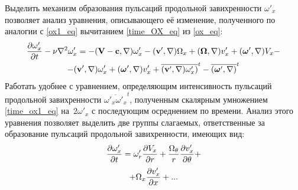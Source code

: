 Выделить механизм образования пульсаций продольной завихренности $\omega'_x$ позволяет анализ уравнения, описывающего её изменение, полученного по аналогии с \eqref{ox1_eq} вычитанием \eqref{time_OX_eq} из \eqref{ox_eq}:
\begin{multline}\label{time_ox1_eq}
\frac{\partial \omega'_x}{\partial t} - \nu \nabla^2 \omega'_x = - (\mathbf{V} - \mathbf{c}, \nabla) \omega'_x - (\mathbf{v}', \nabla) \Omega_x +(\mbox{\boldmath$\Omega$}, \nabla) v'_x + (\mbox{\boldmath$\omega$}', \nabla) V_x - \\ - (\mathbf{v}', \nabla) \omega'_x  + (\mbox{\boldmath$\omega$}', \nabla) v'_x  + \overline{(\mathbf{v}', \nabla) \omega'_x)}^t  - \overline{(\mbox{\boldmath$\omega$}', \nabla)}^t
\end{multline}
Работать удобнее с уравнением, определяющим интенсивность пульсаций продольной завихренности $\overline{\omega'_x \omega'_x}^t$, полученным скалярным умножением \eqref{time_ox1_eq} на~$2 \omega'_x$ с последующим осреднением по времени. Анализ этого уравнения позволяет выделить две группы слагаемых, ответственные за образование пульсаций продольной завихренности, имеющих вид:
\begin{equation}\label{time_ox1gen_terms1}
\frac{\partial \omega'_x}{\partial t} = \omega'_r \frac {\partial V_x}{\partial r} + \frac{\Omega_\theta}{r} \frac{\partial v'_x}{\partial \theta} + 
\end{equation}
\begin{equation}\label{time_ox1gen_term2}
+ \Omega_x \frac {\partial v'_x}{\partial x} + ...
\end{equation}
